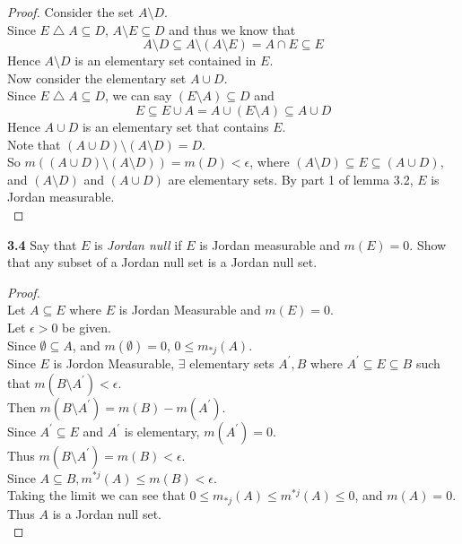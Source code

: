 \documentclass[12pt]{article}
\begin{document}
\begin{proof}
		Consider the set $A \setminus D$. \\
		Since $E \bigtriangleup A \subseteq D$, $A \setminus E \subseteq D$ and thus we know that $$A \setminus D \subseteq A \setminus (A \setminus E) = A \cap E \subseteq E$$
		Hence $A \setminus D$ is an elementary set contained in $E$. \\
		
		Now consider the elementary set $A \cup D$. \\
		Since $E \bigtriangleup A \subseteq D$, we can say $(E \setminus A) \subseteq D$ and 
		$$E \subseteq E \cup A = A \cup (E \setminus A) \subseteq A \cup D$$
		Hence $A \cup D$ is an elementary set that contains $E$. \\
		
		Note that $(A \cup D) \setminus (A \setminus D) = D$.\\
		So $m((A \cup D) \setminus (A \setminus D)) = m(D) < \epsilon$, where $(A \setminus D) \subseteq E \subseteq (A \cup D)$, and $(A \setminus D)$ and $(A \cup D)$ are elementary sets. By part 1 of lemma 3.2, $E$ is Jordan measurable. \\		
	\end{proof}

\hspace{-4 ex}\textbf{3.4} Say that $E$ is \emph{Jordan null} if $E$ is Jordan measurable and $m(E)=0$. Show that any subset of a Jordan null set is a Jordan null set. \bigbreak

	\begin{proof}\text{ }\\
		Let $A \subseteq E$ where $E$ is Jordan Measurable and $m(E)=0$. \\
		Let $\epsilon >0$ be given.\\
		Since $\emptyset \subseteq A$, and $m(\emptyset)=0$,  $0 \leq m_{*j}(A)$.\\
		Since $E$ is Jordon Measurable, $\exists$ elementary sets $A^{\prime}, B$ where $A^{\prime} \subseteq E \subseteq B$ such that $m(B \setminus A^{\prime})<\epsilon$. \\
		Then $m(B \setminus A^{\prime}) = m(B) - m(A^{\prime})$. \\
		Since $A^{\prime} \subseteq E$ and $A^\prime$ is elementary, $m(A^{\prime}) = 0$. \\
		Thus $m(B \setminus A^{\prime}) = m(B) < \epsilon$. \\
		Since $A \subseteq B, m^{*j}(A) \leq m(B) < \epsilon$. \\
		Taking the limit we can see that $0 \leq m_{*j}(A) \leq m^{*j}(A) \leq 0$, and $m(A)=0$.\\
		Thus $A$ is a Jordan null set.\\	
	\end{proof}
\end{document}
